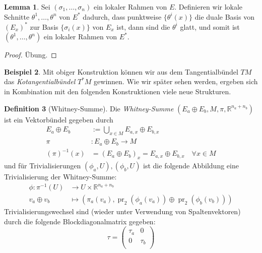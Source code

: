 \documentclass[a4paper]{scrreprt}
\numberwithin{equation}{chapter}
\DeclareMathOperator{\pr}{pr}
\newcommand{\R}{\mathbb{R}}
\theoremstyle{definition}
\newtheorem{defn}{Definition}[section]
\newtheorem{lemma}[defn]{Lemma}
\newtheorem{bsp}[defn]{Beispiel}
\newcommand{\bewUeb}{\begin{proof}Übung.\end{proof}}
\begin{document}
		\begin{lemma} \label{lemma:rahmen_dual}
			Sei $(\sigma_1,\dots,\sigma_n)$ ein lokaler Rahmen von $E$. Definieren wir lokale Schnitte $\theta^1, \dots, \theta^n$ von $E^*$ dadurch, dass punktweise $\{\theta^i(x)\}$ die duale Basis von $(E_x)^*$ zur Basis $\{\sigma_i(x)\}$ von $E_x$ ist, dann sind die $\theta^i$ glatt, und somit ist $(\theta^1,\dots,\theta^n)$ ein lokaler Rahmen von $E^*$.
			\bewUeb
		\end{lemma}
		
		\begin{bsp}
			Mit obiger Konstruktion können wir aus dem Tangentialbündel $TM$ das \emph{Kotangentialbündel} $T^*M$ gewinnen. Wie wir später sehen werden, ergeben sich in Kombination mit den folgenden Konstruktionen viele neue Strukturen.
		\end{bsp}
		\begin{defn}[Whitney-Summe]
			Die \emph{Whitney-Summe} $(E_a\oplus E_b ,M,\pi,\R^{n_a+n_b})$ ist ein Vektorbündel gegeben durch
			\begin{align*}
				E_a\oplus E_b&:=\bigcup_{x\in M}E_{a,x}\oplus E_{b,x}\\
				\pi&\colon E_a\oplus E_b\rightarrow M\\
				(\pi)^{-1}(x)&=(E_a\oplus E_b)_x=E_{a,x}\oplus E_{b,x}\quad \forall x\in M
			\end{align*}
			und für Trivialisierungen $(\phi_a,U),(\phi_b,U)$ ist die folgende Abbildung eine Trivialisierung der Whitney-Summe:
			\begin{align*}
				\phi\colon\pi^{-1}(U)&\rightarrow U\times \R^{n_a+n_b}\\
				v_a\oplus v_b&\mapsto (\pi_a(v_a), \pr_2(\phi_a(v_a))\oplus\pr_2(\phi_b(v_b)))
			\end{align*}
			Trivialisierungswechsel sind (wieder unter Verwendung von Spaltenvektoren) durch die folgende Blockdiagonalmatrix gegeben: 
			\begin{equation}
				\tau=\left(\begin{array}{cc}\tau_a&0\\0&\tau_b\\ \end{array}\right)
			\end{equation}
		\end{defn}
\end{document}
